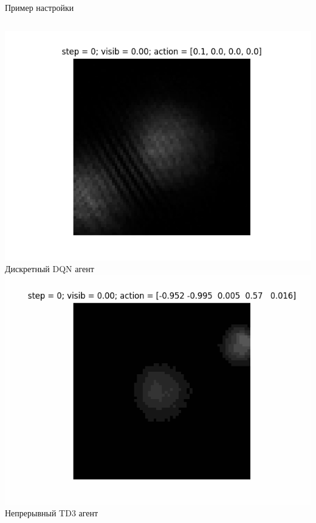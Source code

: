 \begin{frame}{Пример настройки}
\begin{columns}
    \centering
    \includegraphics[width=1\linewidth]{Presentation/images/dqn_1.png}
    Дискретный DQN агент
    \centering
    \includegraphics[width=1\linewidth]{Presentation/images/td3_1.png}
    Непрерывный TD3 агент
\end{columns}
\end{frame}


